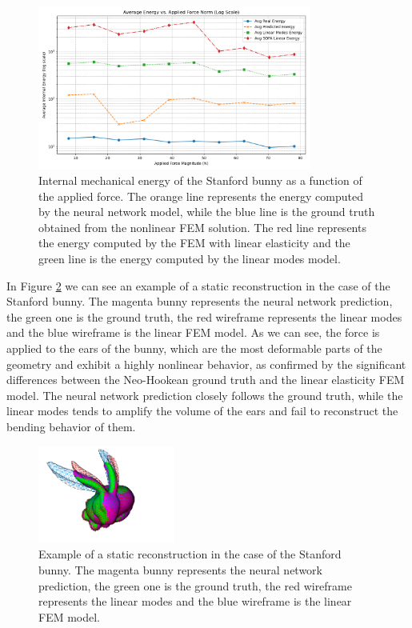 \begin{figure}[ht]
    \centering
    \includegraphics[width=0.8\textwidth]{Images/bunny_static_energy.png}
    \caption{Internal mechanical energy of the Stanford bunny as a function of the applied force. The orange line represents the energy computed by the neural network model, while the blue line is the ground truth obtained from the nonlinear FEM solution. The red line represents the energy computed by the FEM with linear elasticity and the green line is the energy computed by the linear modes model.}
    \label{fig:static_energy_bunny}
    \end{figure}
In  Figure \ref{fig:sofa_example_bunny} we can see an example of a static reconstruction in the case of the Stanford bunny. The magenta bunny represents the neural network prediction, the green one is the ground truth, the red wireframe represents the linear modes and the blue wireframe is the linear FEM model. As we can see, the force is applied  to the ears of the bunny, which are the most deformable parts of the geometry and exhibit a highly nonlinear behavior, as confirmed by the significant differences between the Neo-Hookean ground truth and the linear elasticity FEM model. The neural network prediction closely follows the ground truth, while the linear modes tends to amplify the volume of the ears and fail to reconstruct the bending behavior of them.

\begin{figure}[ht]
    \centering
    \includegraphics[width=0.4\textwidth]{Images/sofa_example_bunny.png}
    \caption{Example of a static reconstruction in the case of the Stanford bunny. The magenta bunny represents the neural network prediction, the green one is the ground truth, the red wireframe represents the linear modes and the blue wireframe is the linear FEM model.}
    \label{fig:sofa_example_bunny}
    \end{figure}
    
